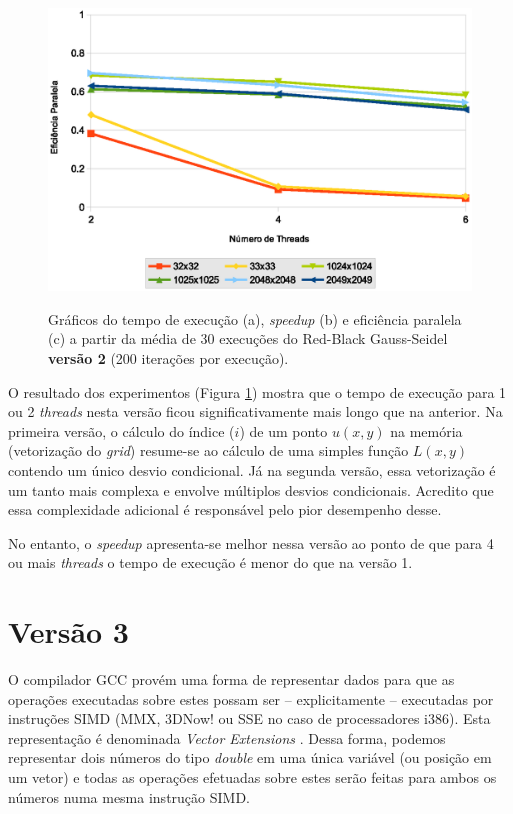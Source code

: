 \begin{figure}[H]
    \begin{minipage}{.5\textwidth}
        \includegraphics[width=\textwidth]{figures/efficiency-v2}
        \label{subfig:efficiency-v2}
    \end{minipage}%

    \caption{Gráficos do tempo de execução (a), \textit{speedup} (b) e eficiência paralela (c) a partir da média de 30 execuções do Red-Black Gauss-Seidel \textbf{versão 2} (200 iterações por execução).}
    \label{fig:perf-v2}
\end{figure}

O resultado dos experimentos (Figura \ref{fig:perf-v2}) mostra que o tempo de execução para 1 ou 2 \textit{threads} nesta versão ficou significativamente mais longo que na anterior. Na primeira versão, o cálculo do índice ($i$) de um ponto $u(x, y)$ na memória (vetorização do \textit{grid}) resume-se ao cálculo de uma simples função $L(x, y)$ contendo um único desvio condicional. Já na segunda versão, essa vetorização é um tanto mais complexa e envolve múltiplos desvios condicionais. Acredito que essa complexidade adicional é responsável pelo pior desempenho desse.

No entanto, o \textit{speedup} apresenta-se melhor nessa versão ao ponto de que para 4 ou mais \textit{threads} o tempo de execução é menor do que na versão 1.


\section{Versão 3}
\label{sec:gs-version3}

O compilador GCC provém uma forma de representar dados para que as operações executadas sobre estes possam ser -- explicitamente -- executadas por instruções SIMD (MMX, 3DNow! ou SSE no caso de processadores i386). Esta representação é denominada \textit{Vector Extensions} \cite{vectorextensions}. Dessa forma, podemos representar dois números do tipo \textit{double} em uma única variável (ou posição em um vetor) e todas as operações efetuadas sobre estes serão feitas para ambos os números numa mesma instrução SIMD.

